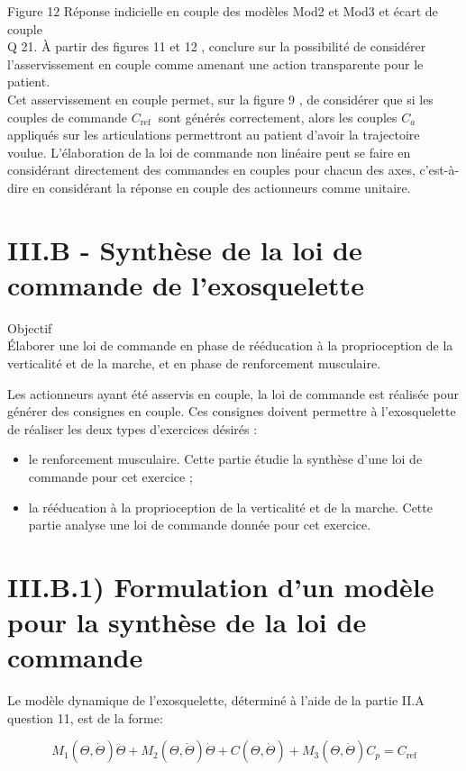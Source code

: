 \documentclass[10pt]{article}
\begin{document}
Figure 12 Réponse indicielle en couple des modèles Mod2 et Mod3 et écart de couple\\
Q 21. À partir des figures 11 et 12 , conclure sur la possibilité de considérer l'asservissement en couple comme amenant une action transparente pour le patient.\\
Cet asservissement en couple permet, sur la figure 9 , de considérer que si les couples de commande $C_{\text {ref }}$ sont générés correctement, alors les couples $C_{a}$ appliqués sur les articulations permettront au patient d'avoir la trajectoire voulue. L'élaboration de la loi de commande non linéaire peut se faire en considérant directement des commandes en couples pour chacun des axes, c'est-à-dire en considérant la réponse en couple des actionneurs comme unitaire.

\section*{III.B - Synthèse de la loi de commande de l'exosquelette}
Objectif\\
Élaborer une loi de commande en phase de rééducation à la proprioception de la verticalité et de la marche, et en phase de renforcement musculaire.

Les actionneurs ayant été asservis en couple, la loi de commande est réalisée pour générer des consignes en couple. Ces consignes doivent permettre à l'exosquelette de réaliser les deux types d'exercices désirés :

\begin{itemize}
  \item le renforcement musculaire. Cette partie étudie la synthèse d'une loi de commande pour cet exercice ;
  \item la rééducation à la proprioception de la verticalité et de la marche. Cette partie analyse une loi de commande donnée pour cet exercice.
\end{itemize}

\section*{III.B.1) Formulation d'un modèle pour la synthèse de la loi de commande}
Le modèle dynamique de l'exosquelette, déterminé à l'aide de la partie II.A question 11, est de la forme:

$$
M_{1}(\Theta, \dot{\Theta}) \ddot{\Theta}+M_{2}(\Theta, \dot{\Theta}) \dot{\Theta}+C(\Theta, \dot{\Theta})+M_{3}(\Theta, \dot{\Theta}) C_{p}=C_{\mathrm{ref}}
$$
\end{document}
